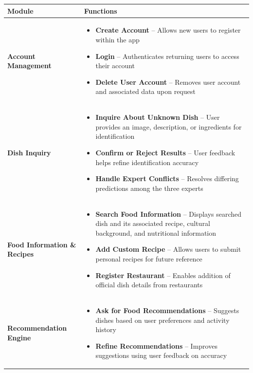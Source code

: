 \documentclass[]{article}
\begin{document}
\begin{table}[H]
	\centering
	\renewcommand{\arraystretch}{1.2} %
	\begin{tabular}{|p{4cm}|p{10cm}|}
	\hline
	\textbf{Module} & \textbf{Functions} \\
	\hline
	\textbf{Account Management} &
	\begin{itemize}
		\item \textbf{Create Account} – Allows new users to register within the app
		\item \textbf{Login} – Authenticates returning users to access their account
		\item \textbf{Delete User Account} – Removes user account and associated data upon request
	\end{itemize} \\
	\hline
	\textbf{Dish Inquiry} &
	\begin{itemize}
		\item \textbf{Inquire About Unknown Dish} – User provides an image, description, or ingredients for identification
		\item \textbf{Confirm or Reject Results} – User feedback helps refine identification accuracy 
		\item \textbf{Handle Expert Conflicts} – Resolves differing predictions among the three experts
	\end{itemize} \\
	\hline
	\textbf{Food Information \& Recipes} &
	\begin{itemize}
		\item \textbf{Search Food Information} – Displays searched dish and its associated recipe, cultural background, and nutritional information
		\item \textbf{Add Custom Recipe} – Allows users to submit personal
	recipes for future reference
		\item \textbf{Register Restaurant} – Enables addition of official dish details from restaurants
	\end{itemize} \\
	\hline
	\textbf{Recommendation Engine} &
	\begin{itemize}
		\item \textbf{Ask for Food Recommendations} – Suggests dishes based on user preferences and activity history
		\item \textbf{Refine Recommendations} – Improves suggestions using user feedback on accuracy
	\end{itemize} \\

\end{tabular}
\end{table}
\end{document}
